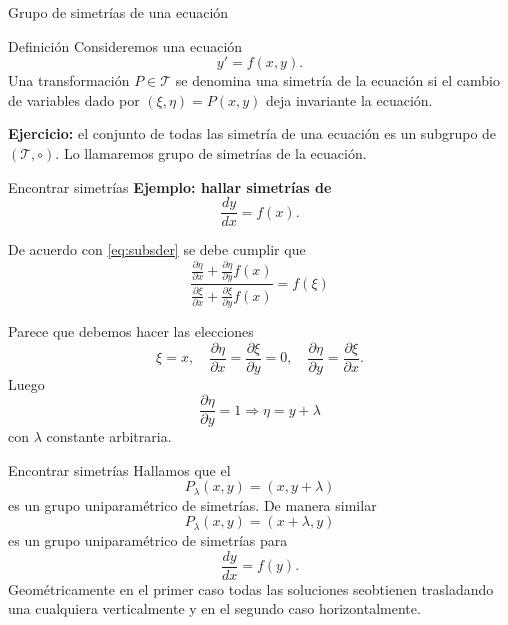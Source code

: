 \documentclass[handout,hyperref={colorlinks=true}]{beamer}
\renewcommand{\emph}[1]{\textcolor[rgb]{1,0,0}{#1}}
\begin{document}
\begin{frame}{Grupo de simetrías de una ecuación}

\begin{block}{Definición}
Consideremos una ecuación
\[y'=f(x,y).\]
Una transformación $P\in \mathscr{T}$ se denomina una simetría de la ecuación si el cambio de variables dado por $(\xi,\eta)=P(x,y)$ deja invariante  la ecuación. 

\textbf{Ejercicio:} el conjunto de todas las simetría de una ecuación es un subgrupo de  $( \mathscr{T},\circ)$. Lo llamaremos \emph{grupo de simetrías} de la ecuación.

 

\end{block}


\end{frame}

 \begin{frame}{Encontrar simetrías}
 \textbf{Ejemplo: hallar simetrías de }
\[\frac{dy}{dx}=f(x).\]

De acuerdo con \eqref{eq:subsder} se debe cumplir que 
 \[\frac{\frac{\partial\eta}{\partial x}+\frac{\partial\eta}{\partial y}f(x)}{\frac{\partial\xi}{\partial x}+\frac{\partial\xi}{\partial y}f(x)}=f(\xi)\]

 Parece que debemos hacer las elecciones
   \[\boxed{\xi=x},\quad \frac{\partial\eta}{\partial x}=\frac{\partial\xi}{\partial y}=0,\quad
   \frac{\partial\eta}{\partial y}=\frac{\partial\xi}{\partial x}. \]
 Luego 
\[\frac{\partial\eta}{\partial y}=1\Rightarrow \boxed{\eta=y+\lambda} \]
con $\lambda$ constante arbitraria.
 \end{frame}

\begin{frame}{Encontrar simetrías}
Hallamos que el 
\[P_{\lambda}(x,y)=(x,y+\lambda)\]
es un grupo uniparamétrico de simetrías. De manera similar
\[P_{\lambda}(x,y)=(x+\lambda,y)\]
es un grupo uniparamétrico de simetrías para 
\[\frac{dy}{dx}=f(y).\]
Geométricamente en el primer caso todas las soluciones seobtienen trasladando una cualquiera verticalmente y en el segundo caso horizontalmente.

\end{frame}
\end{document}
